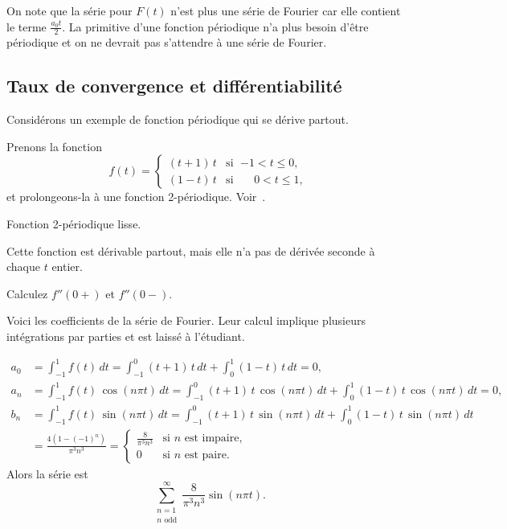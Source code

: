 On note que la série pour $F(t)$ n'est plus une série de Fourier car elle contient le terme
 $\frac{a_0 t}{2}$.  La primitive d'une fonction périodique n'a plus besoin d'être périodique et on ne devrait pas
s'attendre à une série de Fourier.

\subsection{Taux de convergence et différentiabilité}

Considérons un exemple de fonction périodique qui se dérive partout.

\begin{example}
Prenons la fonction
\begin{equation*}
f(t) =
\begin{cases}
(t+1)\,t & \text{si } \; {-1} < t \leq 0 , \\
(1-t)\,t & \text{si } \; \phantom{-}0 < t \leq 1 ,
\end{cases}
\end{equation*}
et prolongeons-la à une fonction 
2-périodique.  Voir~.

\begin{myfig}
\capstart
{}
\caption{Fonction 2-périodique lisse.\label{gfs:smoothexfig}}
\end{myfig}

Cette fonction est dérivable partout, mais elle
n'a pas de dérivée seconde à chaque $t$ entier.

\begin{exercise}
Calculez  $f''(0+)$ et $f''(0-)$.
\end{exercise}

Voici les coefficients de la série de Fourier.  Leur calcul 
implique plusieurs intégrations par parties et est laissé à l'étudiant.

\begin{align*}
a_0 & = 
\int_{-1}^1
f(t) \, dt = 
\int_{-1}^0
(t+1)\,t \, dt +
\int_0^1
(1-t)\,t \, dt = 0 , \\
a_n & = 
\int_{-1}^1
f(t) \, \cos (n\pi t) \, dt = 
\int_{-1}^0
(t+1)\,t
\, \cos (n \pi t) \, dt +
\int_0^1
(1-t)\,t
\, \cos (n \pi t) \, dt = 0, \\
b_n & = 
\int_{-1}^1
f(t) \, \sin (n\pi t) \, dt = 
\int_{-1}^0
(t+1)\,t
\, \sin (n \pi t) \, dt +
\int_0^1
(1-t)\,t
\, \sin (n \pi t) \, dt \\
& =
\frac{4 ( 1-{(-1)}^n)}{\pi^3 n^3} 
=
\begin{cases}
\frac{8}{\pi^3 n^3} & \text{si } n \text{ est impaire} , \\
0 & \text{si } n \text{ est paire} .
\end{cases}
\end{align*}
Alors la série est 
\begin{equation*}
\sum_{\substack{n=1 \\ n \text{ odd}}}^\infty \frac{8}{\pi^3 n^3} \sin (n \pi t) .
\end{equation*}


\end{example}
